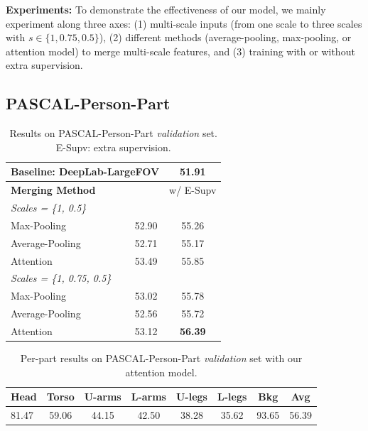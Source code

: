 \textbf{Experiments:} To demonstrate the effectiveness of our model, we mainly experiment along three axes: (1) multi-scale inputs (from one scale to three scales with $s \in \{1, 0.75, 0.5\}$), (2) different methods (average-pooling, max-pooling, or attention model) to merge multi-scale features, and (3) training with or without extra supervision.


\subsection{PASCAL-Person-Part}

\begin{table}
  \centering
  \addtolength{\tabcolsep}{2.5pt}
    \begin{tabular}{l c c}
      \toprule[0.2 em]
      \multicolumn{2}{l}{Baseline: DeepLab-LargeFOV} & 51.91  \\
      \toprule[0.2 em]
      {\bf Merging Method} &  & w/ E-Supv \\
      \midrule
      \midrule
      {\it Scales = \{1, 0.5\}} & & \\
      Max-Pooling & 52.90 & 55.26 \\
      Average-Pooling & 52.71 & 55.17 \\
      Attention & 53.49 & 55.85 \\
      \midrule
      {\it Scales = \{1, 0.75, 0.5\}} & & \\
      Max-Pooling & 53.02 & 55.78\\
      Average-Pooling & 52.56 & 55.72 \\
      Attention & 53.12 & {\bf 56.39} \\
      \bottomrule[0.1 em]
    \end{tabular}
    \vspace{1pt}
    \caption{Results on PASCAL-Person-Part {\it validation} set. E-Supv: extra supervision.}
    \label{tab:deeplab_part}
\end{table}

\begin{table}
  \centering
  \small
  \addtolength{\tabcolsep}{-2.5pt}
    \begin{tabular}{lccccccc}
    \toprule[0.2 em]
    Head & Torso & U-arms & L-arms & U-legs & L-legs & Bkg & Avg \\
    \midrule
    81.47 & 59.06 & 44.15 & 42.50 & 38.28 & 35.62 & 93.65 & 56.39 \\
    \bottomrule[0.1 em]
    \end{tabular}
    \caption{Per-part results on PASCAL-Person-Part {\it validation} set with our attention model.}
    \label{tab:deeplab_everypart}
\end{table}

